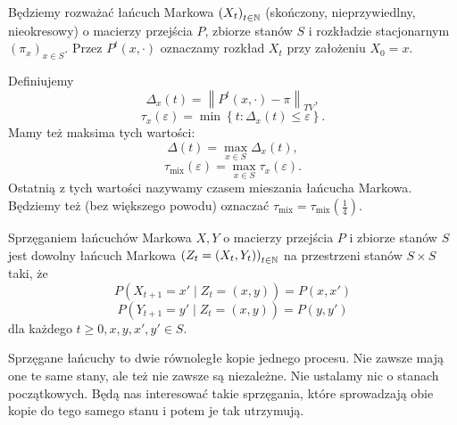 Będziemy rozważać łańcuch Markowa \(\left( X_t \right) _{t \in \mathbb{N}}\) (skończony, nieprzywiedlny, nieokresowy) o macierzy przejścia \(P\), zbiorze stanów \(S\) i rozkładzie stacjonarnym \(\left( \pi_x \right) _{x \in S}\). Przez \(P^{t}\left( x, \cdot \right) \) oznaczamy rozkład \(X_t\) przy założeniu \(X_0 = x \).

\begin{definition}
	Definiujemy \[ \Delta_x\left( t  \right) = \left\|P^{t}\left( x, \cdot  \right) - \pi\right\|_{TV}, \]
	\[ \tau_x\left( \varepsilon  \right) = \min \left\{ t : \Delta_x\left( t  \right) \le \varepsilon  \right\} . \]
	Mamy też maksima tych wartości:
	\[ \Delta\left( t  \right) = \max_{x \in S} \Delta_x\left( t  \right) , \]
	\[ \tau_{\mathrm{mix}}\left( \varepsilon  \right) = \max_{x \in S} \tau_x\left( \varepsilon  \right) . \]
	Ostatnią z tych wartości nazywamy czasem mieszania łańcucha Markowa. Będziemy też (bez większego powodu) oznaczać \(\tau_{\mathrm{mix}} = \tau_{\mathrm{mix}}\left( \frac{1}{4} \right) \).
\end{definition}

\begin{definition}
	Sprzęganiem łańcuchów Markowa \(X,Y\) o macierzy przejścia \(P\) i zbiorze stanów \(S\) jest dowolny łańcuch Markowa \(\left( Z_t = \left( X_t, Y_t \right)  \right) _{t \in \mathbb{N}}\) na przestrzeni stanów \(S \times S\) taki, że
	\[ P\left( X_{t+1} = x' \mid Z_t = \left( x,y \right)  \right) = P\left( x,x' \right)  \]
	\[ P\left( Y_{t+1} = y' \mid Z_t = \left( x,y \right)  \right) = P\left( y, y' \right)  \]
	dla każdego \(t\ge 0, x,y,x',y' \in S\).

	Sprzęgane łańcuchy to dwie równoległe kopie jednego procesu. Nie zawsze mają one te same stany, ale też nie zawsze są niezależne. Nie ustalamy nic o stanach początkowych. Będą nas interesować takie sprzęgania, które sprowadzają obie kopie do tego samego stanu i potem je tak utrzymują.
\end{definition}

